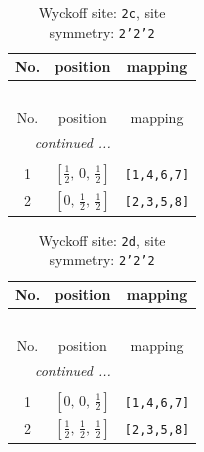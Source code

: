 \documentclass[fleqn,8pt]{jsarticle}
\begin{document}
\begin{longtable}{ccc}
\caption{Wyckoff site: {\tt 2c}, site symmetry: {\tt 2'2'2}}
 \\
 \hline \hline
No. & position & mapping \\ \hline \endfirsthead

\multicolumn{2}{l}{\tablename\ \thetable{}} \\
 \hline \hline
No. & position & mapping \\ \hline \endhead

 \hline \hline
\multicolumn{2}{r}{\footnotesize\it continued ...} \\ \endfoot

 \hline \hline
\multicolumn{2}{r}{} \\ \endlastfoot

1 & $\left[ \frac{1}{2},\, 0,\, \frac{1}{2} \right]$ & {\tt [1,4,6,7]} \\ \hline
2 & $\left[ 0,\, \frac{1}{2},\, \frac{1}{2} \right]$ & {\tt [2,3,5,8]} \\
\end{longtable}
\renewcommand{\arraystretch}{1.2}
\begin{longtable}{ccc}
\caption{Wyckoff site: {\tt 2d}, site symmetry: {\tt 2'2'2}}
 \\
 \hline \hline
No. & position & mapping \\ \hline \endfirsthead

\multicolumn{2}{l}{\tablename\ \thetable{}} \\
 \hline \hline
No. & position & mapping \\ \hline \endhead

 \hline \hline
\multicolumn{2}{r}{\footnotesize\it continued ...} \\ \endfoot

 \hline \hline
\multicolumn{2}{r}{} \\ \endlastfoot

1 & $\left[ 0,\, 0,\, \frac{1}{2} \right]$ & {\tt [1,4,6,7]} \\ \hline
2 & $\left[ \frac{1}{2},\, \frac{1}{2},\, \frac{1}{2} \right]$ & {\tt [2,3,5,8]} \\
\end{longtable}
\renewcommand{\arraystretch}{1.2}
\end{document}

